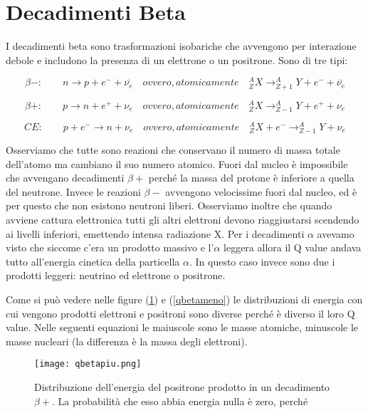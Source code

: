 \documentclass [a4paper, twoside] {book}
\begin{document}
\section{Decadimenti Beta}

I decadimenti beta sono trasformazioni isobariche che avvengono per interazione debole e includono la presenza di un elettrone o un positrone. Sono di tre tipi:

\begin{equation}
\beta-: \qquad n \longrightarrow p + e^-+\bar{\nu_e}  \quad ovvero, atomicamente \quad  ^A_ZX \longrightarrow _{Z+1}^AY+e^-+\bar{\nu_e}
\end{equation}


\begin{equation}
\beta+: \qquad p \longrightarrow n + e^++\nu_e \quad ovvero, atomicamente \quad  ^A_ZX \longrightarrow _{Z-1}^AY+e^++\nu_e
\end{equation}


\begin{equation}
CE: \qquad p + e^- \longrightarrow n + \nu_e \quad ovvero, atomicamente \quad  ^A_ZX+e^- \longrightarrow _{Z-1}^AY+\nu_e
\end{equation}

Osserviamo che tutte sono reazioni che conservano il numero di massa totale dell'atomo ma cambiano il suo numero atomico.
Fuori dal nucleo è impossibile che avvengano decadimenti $\beta+$ perché la massa del protone è inferiore a quella del neutrone. Invece le reazioni $\beta-$ avvengono velocissime fuori dal nucleo, ed è per questo che non esistono neutroni liberi.
Osserviamo inoltre che quando avviene cattura elettronica tutti gli altri elettroni devono riaggiustarsi scendendo ai livelli inferiori, emettendo intensa radiazione X.
Per i decadimenti $\alpha$ avevamo visto che siccome c'era un prodotto massivo e l'$\alpha$ leggera allora il Q value andava tutto all'energia cinetica della particella $\alpha$. In questo caso invece sono due i prodotti leggeri: neutrino ed elettrone o positrone.

 Come si può vedere nelle figure (\ref{qbetapiu}) e (\ref{qbetameno}) le distribuzioni di energia con cui vengono prodotti elettroni e positroni sono diverse perché è diverso il loro Q value. Nelle seguenti equazioni le maiuscole sono le masse atomiche, minuscole le masse nucleari (la differenza è la massa degli elettroni).

\begin{figure} []
\centering
		\texttt{[image: qbetapiu.png]}
		\caption{Distribuzione dell'energia del positrone prodotto in un decadimento $\beta+$. La probabilità che esso abbia energia nulla è zero, perché}
         \label{qbetapiu}
\end{figure}
\end{document}
